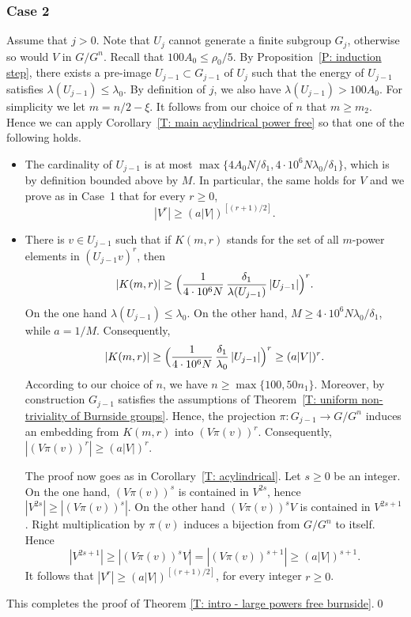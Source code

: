 \documentclass[JEP,XML,SOM,Unicode, NoEqCountersInSection,published]{cedram}
\theoremstyle{plain}
\theoremstyle{definition}
\begin{document}
\subsubsection*{Case 2}
Assume that $j > 0$.
Note that $U_j$ cannot generate a finite subgroup $G_j$, otherwise so would $V$ in $G/G^n$.
Recall that $100 A_0 \leq \rho_0/5$.
By Proposition~\ref{P: induction step}, there exists a pre-image $U_{j-1}\subset G_{j-1}$ of $U_j$ such that the energy of $U_{j-1}$ satisfies $\lambda(U_{j-1}) \leqslant \lambda_0$.
By definition of $j$, we also have $\lambda(U_{j-1})> 100A_0$.
For simplicity we let $m = n/2 - \xi$.
It follows from our choice of $n$ that $m \geq m_2$.
Hence we can apply Corollary~\ref{T: main acylindrical power free} so that one of the following holds.
\begin{itemize}
\item The cardinality of $U_{j-1}$ is at most $\max\{4A_0N/\delta_1,4\cdot 10^6 N \lambda_0/\delta_1\}$, which is by definition bounded above by $M$.
In particular, the same holds for $V$ and we prove as in Case~1 that for every $r \geq 0$,
\begin{equation*}
|V^r| \geq \left(a |V|\right)^{[(r+1)/2]}.
\end{equation*}
\item There is $v \in U_{j-1}$ such that if $K(m,r)$ stands for the set of all $m$-power elements in $(U_{j-1}v)^r$, then
\begin{equation*}
|K(m,r)|
\geq \Bigl( \frac{1}{4\cdot 10^6 N}\,\frac{\delta_1}{\lambda(U_{j-1})}\, |U_{j-1}|\Bigr)^r.
\end{equation*}
On the one hand $\lambda(U_{j-1}) \leqslant \lambda_0$.
On the other hand, $M \geq 4\cdot 10^6 N \lambda_0/\delta_1$, while $a = 1/M$.
Consequently,
\begin{equation*}
|K(m,r)|
\geq \Bigl( \frac{1}{4\cdot 10^6 N}\,\frac{\delta_1}{\lambda_0}\, |U_{j-1}|\Bigr)^r
\geq(a|V|)^r.
\end{equation*}
According to our choice of $n$, we have $n \geq \max\{100, 50n_1\}$.
Moreover, by construction $G_{j-1}$ satisfies the assumptions of Theorem~\ref{T: uniform non-triviality of Burnside groups}.
Hence, the projection $\pi \colon G_{j-1} \to G/G^n$ induces an embedding from $K(m,r)$ into $(V \pi(v))^r$.
Consequently, $|(V \pi(v))^r| \geq \left(a |V|\right)^{r}.$

The proof now goes as in Corollary~\ref{T: acylindrical}.
Let $s \geq 0$ be an integer.
On the one hand, $(V\pi(v))^s$ is contained in $V^{2s}$, hence $|V^{2s}| \geq |(V\pi(v))^s|$.
On the other hand $(V\pi(v))^sV$ is contained in $V^{2s+1}$.
Right multiplication by $\pi(v)$ induces a bijection from $G/G^n$ to itself.
Hence
\begin{equation*}
|V^{2s+1}| \geq |(V\pi(v))^sV| = |(V\pi(v))^{s+1}| \geq \left(a |V|\right)^{s+1}.
\end{equation*}
It follows that $|V^r| \geq \left(a |V|\right)^{[(r+1)/2]}$, for every integer $r \geq 0$.
\end{itemize}
This completes the proof of Theorem \ref{T: intro - large powers free burnside}.\qed
\end{document}
